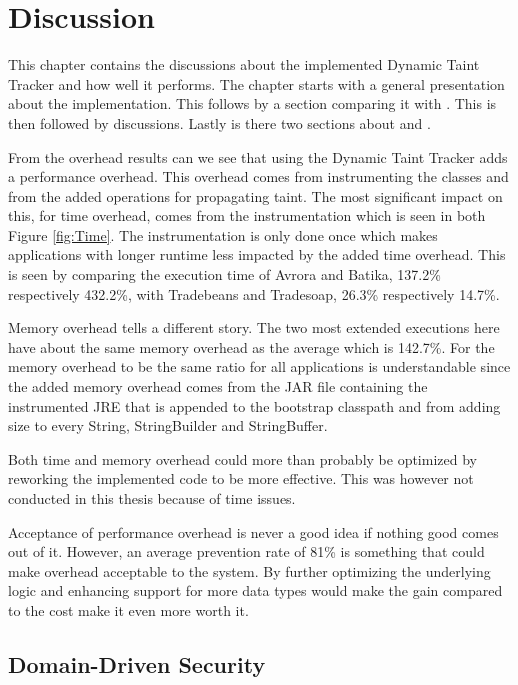 \chapter{Discussion}
This chapter contains the discussions about the implemented Dynamic Taint Tracker and how well it performs. The chapter starts with a general presentation about the implementation. This follows by a section comparing it with \textit{}. This is then followed by \textit{} discussions. Lastly is there two sections about \textit{} and \textit{}.

From the overhead results can we see that using the Dynamic Taint Tracker adds a performance overhead. This overhead comes from instrumenting the classes and from the added operations for propagating taint. The most significant impact on this, for time overhead, comes from the instrumentation which is seen in both Figure \ref{fig:Time}. The instrumentation is only done once which makes applications with longer runtime less impacted by the added time overhead. This is seen by comparing the execution time of Avrora and Batika, 137.2\% respectively 432.2\%, with Tradebeans and Tradesoap, 26.3\% respectively 14.7\%.

Memory overhead tells a different story. The two most extended executions here have about the same memory overhead as the average which is 142.7\%. For the memory overhead to be the same ratio for all applications is understandable since the added memory overhead comes from the JAR file containing the instrumented JRE that is appended to the bootstrap classpath and from adding size to every String, StringBuilder and StringBuffer.

Both time and memory overhead could more than probably be optimized by reworking the implemented code to be more effective. This was however not conducted in this thesis because of time issues.

Acceptance of performance overhead is never a good idea if nothing good comes out of it. However, an average prevention rate of 81\% is something that could make overhead acceptable to the system. By further optimizing the underlying logic and enhancing support for more data types would make the gain compared to the cost make it even more worth it.



\section{Domain-Driven Security}
\label{security}


